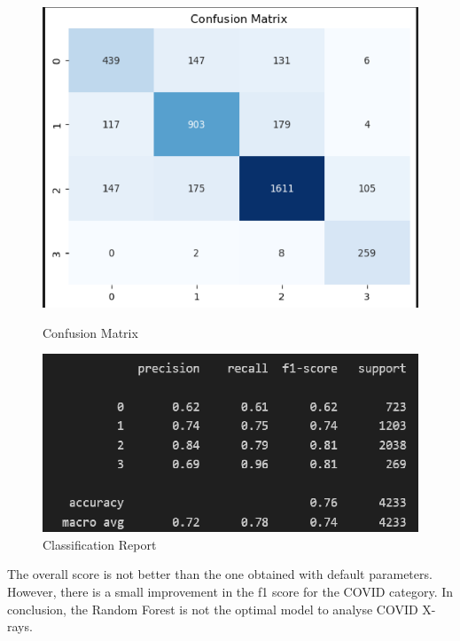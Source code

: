\documentclass{article}
\begin{document}
\begin{figure}[H]
    \centering
    \begin{minipage}[t]{0.48\textwidth}
        \centering
        \includegraphics[width=\linewidth]{CM_RF_opt.png}
        \caption{Confusion Matrix}
        \label{fig:confusion_rf}
    \end{minipage}
    \hfill
    \begin{minipage}[t]{0.48\textwidth}
        \centering
        \includegraphics[width=\linewidth]{CR_RF_opt.png}
        \caption{Classification Report}
        \label{fig:classification_rf}
    \end{minipage}
\end{figure}

The overall score is not better than the one obtained with default parameters. However, there is a small improvement in the f1 score for the COVID category.
In conclusion, the Random Forest is not the optimal model to analyse COVID X-rays. 
\end{document}
